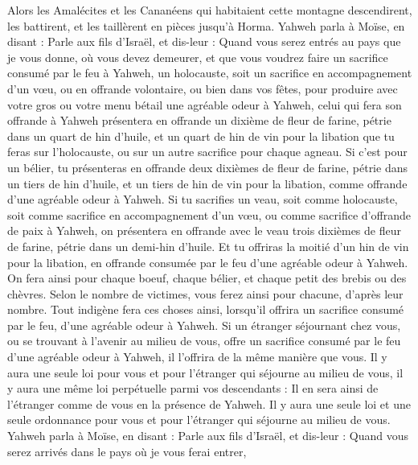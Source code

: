 \begin{multicols}{2}
Alors les Amalécites et les Cananéens qui habitaient cette montagne descendirent, les battirent, et les taillèrent en pièces jusqu'à Horma.
\VerseOne{}Yahweh parla à Moïse, en disant :
Parle aux fils d'Israël, et dis-leur : Quand vous serez entrés au pays que je vous donne, où vous devez demeurer,
et que vous voudrez faire un sacrifice consumé par le feu à Yahweh, un holocauste, soit un sacrifice en accompagnement d’un vœu, ou en offrande volontaire, ou bien dans vos fêtes, pour produire avec votre gros ou votre menu bétail une agréable odeur à Yahweh,
celui qui fera son offrande à Yahweh présentera en offrande un dixième de fleur de farine, pétrie dans un quart de hin d'huile,
et un quart de hin de vin pour la libation que tu feras sur l'holocauste, ou sur un autre sacrifice pour chaque agneau.
Si c'est pour un bélier, tu présenteras en offrande deux dixièmes de fleur de farine, pétrie dans un tiers de hin d'huile,
et un tiers de hin de vin pour la libation, comme offrande d’une agréable odeur à Yahweh.
Si tu sacrifies un veau, soit comme holocauste, soit comme sacrifice en accompagnement d’un vœu, ou comme sacrifice d’offrande de paix à Yahweh,
on présentera en offrande avec le veau trois dixièmes de fleur de farine, pétrie dans un demi-hin d'huile.
Et tu offriras la moitié d'un hin de vin pour la libation, en offrande consumée par le feu d’une agréable odeur à Yahweh.
On fera ainsi pour chaque boeuf, chaque bélier, et chaque petit des brebis ou des chèvres.
Selon le nombre de victimes, vous ferez ainsi pour chacune, d’après leur nombre.
Tout indigène fera ces choses ainsi, lorsqu’il offrira un sacrifice consumé par le feu, d’une agréable odeur à Yahweh.
Si un étranger séjournant chez vous, ou se trouvant à l’avenir au milieu de vous, offre un sacrifice consumé par le feu d’une agréable odeur à Yahweh, il l’offrira de la même manière que vous.
Il y aura une seule loi pour vous et pour l'étranger qui séjourne au milieu de vous, il y aura une même loi perpétuelle parmi vos descendants : Il en sera ainsi de l'étranger comme de vous en la présence de Yahweh.
Il y aura une seule loi et une seule ordonnance pour vous et pour l'étranger qui séjourne au milieu de vous.
Yahweh parla à Moïse, en disant :
Parle aux fils d'Israël, et dis-leur : Quand vous serez arrivés dans le pays où je vous ferai entrer,

\end{multicols}
